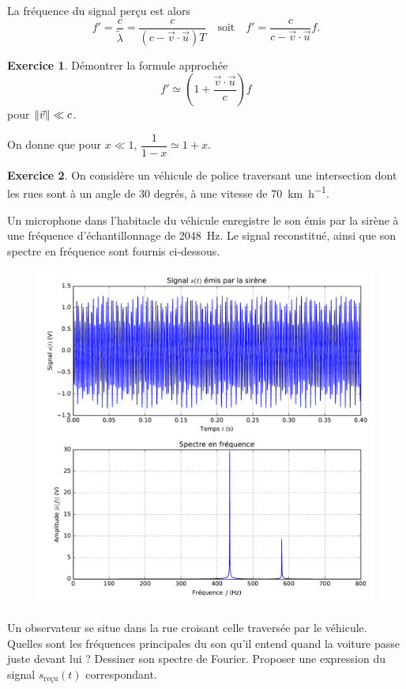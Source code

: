 \documentclass{article}
\DeclarePairedDelimiter{\norm}{\lVert}{\rVert}
\theoremstyle{definition}
\newtheorem{exo}{Exercice}
\begin{document}
La fréquence du signal perçu est alors
\begin{equation}
	f' = \frac{c}{\tilde{\lambda}} = \frac{c}{(c-\vec v \cdot \vec u)T}\quad\text{soit}\quad
	\boxed{f' = \frac{c}{c-\vec v\cdot\vec u}f.}
\end{equation}

\begin{exo}
	Démontrer la formule approchée
	\begin{equation}
		f' \simeq \left(1+\frac{\vec v\cdot \vec u}{c}\right)f
	\end{equation}
	pour $\norm{\vec v}\ll c$.
	
	On donne que pour $x\ll 1$, $\dfrac{1}{1-x}\simeq 1+x$.
\end{exo}

\begin{exo}
	On considère un véhicule de police traversant une intersection dont les rues sont à un angle de 30 degrés, à une vitesse de \SI{70}{\kilo\meter\per\hour}.
	 	
	Un microphone dans l'habitacle du véhicule enregistre le son émis par la sirène à une fréquence d'échantillonnage de \SI{2048}{\hertz}. Le signal reconstitué, ainsi que son spectre en fréquence sont fournis ci-dessous.
	
	\begin{figure}[h]
		\includegraphics[width=\textwidth]{parts/doppler/sirene.pdf}
	\end{figure}
	
	Un observateur se situe dans la rue croisant celle traversée par le véhicule. Quelles sont les fréquences principales du son qu'il entend quand la voiture passe juste devant lui ? Dessiner son spectre de Fourier. Proposer une expression du signal $s_\mathrm{reçu}(t)$ correspondant.
\end{exo}
\end{document}
